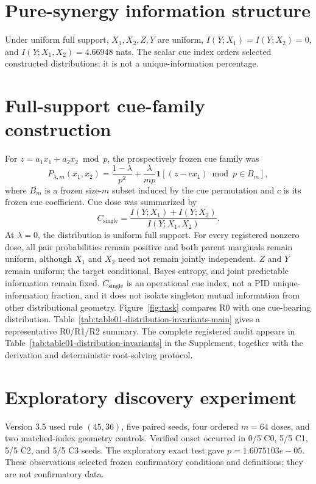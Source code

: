 \documentclass[10pt]{article}
\begin{document}
\section{Pure-synergy information structure}
Under uniform full support, $X_1,X_2,Z,Y$ are uniform,
$I(Y;X_1)=I(Y;X_2)=0$, and
$I(Y;X_1,X_2)=4.66948$ nats. The scalar cue index orders
selected constructed distributions; it is not a unique-information percentage.

\section{Full-support cue-family construction}
For $z=a_1x_1+a_2x_2 \bmod p$, the prospectively frozen cue family was
\[
P_{\lambda,m}(x_1,x_2)
=\frac{1-\lambda}{p^2}
+\frac{\lambda}{mp}
\mathbf{1}\!\left[(z-cx_1)\bmod p\in B_m\right],
\]
where $B_m$ is a frozen size-$m$ subset induced by the cue permutation and
$c$ is its frozen cue coefficient. Cue dose was summarized by
\[
C_{\mathrm{single}}
=\frac{I(Y;X_1)+I(Y;X_2)}{I(Y;X_1,X_2)}.
\]
At $\lambda=0$, the distribution is uniform full support. For every
registered nonzero dose, all pair probabilities remain positive and both
parent marginals remain uniform, although $X_1$ and $X_2$ need not remain
jointly independent. $Z$ and $Y$ remain uniform; the target conditional,
Bayes entropy, and joint predictable information remain fixed.
$C_{\mathrm{single}}$ is an operational cue index, not a PID
unique-information fraction, and it does not isolate singleton mutual
information from other distributional geometry. Figure~\ref{fig:task}
compares R0 with one cue-bearing distribution.
Table~\ref{tab:table01-distribution-invariants-main} gives a representative
R0/R1/R2 summary. The complete registered audit appears in
Table~\ref{tab:table01-distribution-invariants} in the Supplement, together
with the derivation and deterministic root-solving protocol.



\section{Exploratory discovery experiment}
Version 3.5 used rule $(45,36)$, five paired seeds, four ordered $m=64$ doses,
and two matched-index geometry controls. Verified onset occurred in
0/5 C0, 5/5 C1, 5/5 C2, and
5/5 C3 seeds. The exploratory exact test gave
$p=1.6075103e-05$. These observations selected frozen
confirmatory conditions and definitions; they are not confirmatory data.
\end{document}
